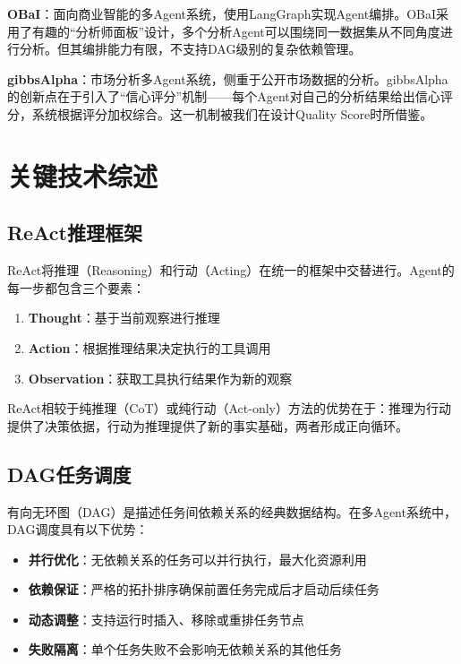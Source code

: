 \documentclass[12pt,a4paper]{ctexrep}
\begin{document}
\textbf{OBaI}\cite{obai2025}：面向商业智能的多Agent系统，使用LangGraph实现Agent编排。OBaI采用了有趣的``分析师面板''设计，多个分析Agent可以围绕同一数据集从不同角度进行分析。但其编排能力有限，不支持DAG级别的复杂依赖管理。

\textbf{gibbsAlpha}\cite{gibbsalpha2025}：市场分析多Agent系统，侧重于公开市场数据的分析。gibbsAlpha的创新点在于引入了``信心评分''机制——每个Agent对自己的分析结果给出信心评分，系统根据评分加权综合。这一机制被我们在设计Quality Score时所借鉴。

\section{关键技术综述}

\subsection{ReAct推理框架}

ReAct\cite{react2023}将推理（Reasoning）和行动（Acting）在统一的框架中交替进行。Agent的每一步都包含三个要素：

\begin{enumerate}[leftmargin=2em]
\item \textbf{Thought}：基于当前观察进行推理
\item \textbf{Action}：根据推理结果决定执行的工具调用
\item \textbf{Observation}：获取工具执行结果作为新的观察
\end{enumerate}

ReAct相较于纯推理（CoT）或纯行动（Act-only）方法的优势在于：推理为行动提供了决策依据，行动为推理提供了新的事实基础，两者形成正向循环。

\subsection{DAG任务调度}

有向无环图（DAG）是描述任务间依赖关系的经典数据结构\cite{dag2002}。在多Agent系统中，DAG调度具有以下优势：

\begin{itemize}[leftmargin=2em]
\item \textbf{并行优化}：无依赖关系的任务可以并行执行，最大化资源利用
\item \textbf{依赖保证}：严格的拓扑排序确保前置任务完成后才启动后续任务
\item \textbf{动态调整}：支持运行时插入、移除或重排任务节点
\item \textbf{失败隔离}：单个任务失败不会影响无依赖关系的其他任务
\end{itemize}
\end{document}
